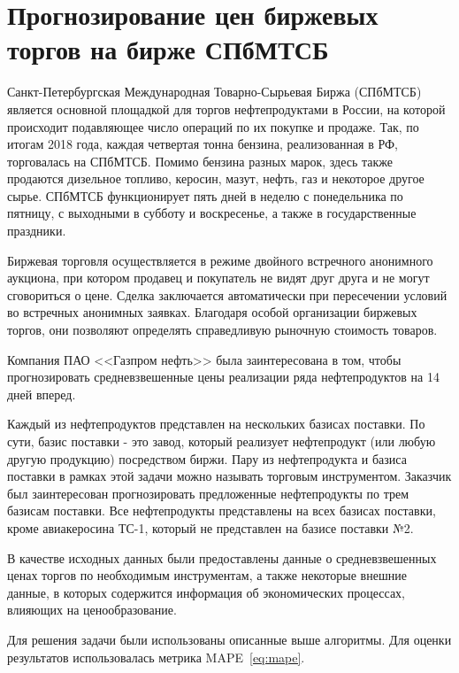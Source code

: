 \documentclass[a4paper,article,14pt]{extarticle}
\begin{document}


\pagebreak

\section{Прогнозирование цен биржевых торгов на бирже СПбМТСБ}

Санкт-Петербургская Международная Товарно-Сырьевая Биржа \linebreak
(СПбМТСБ)~\cite{spimex} является основной площадкой для торгов нефтепродуктами в России, на которой происходит подавляющее число операций по их покупке и продаже.
Так, по итогам 2018 года, каждая четвертая тонна бензина, реализованная в РФ, торговалась на СПбМТСБ.
Помимо бензина разных марок, здесь также продаются дизельное топливо, керосин, мазут, нефть, газ и некоторое другое сырье.
СПбМТСБ функционирует пять дней в неделю с понедельника по пятницу, с выходными в субботу и воскресенье, а также в государственные праздники.

Биржевая торговля осуществляется в режиме двойного встречного анонимного аукциона, при котором продавец и покупатель не видят друг друга и не могут сговориться о цене.
Сделка заключается автоматически при пересечении условий во встречных анонимных заявках.
Благодаря особой организации биржевых торгов, они позволяют определять справедливую рыночную стоимость товаров.

Компания ПАО <<Газпром нефть>> была заинтересована в том, чтобы прогнозировать средневзвешенные цены реализации ряда нефтепродуктов на 14 дней вперед.

Каждый из нефтепродуктов представлен на нескольких базисах поставки.
По сути, базис поставки - это завод, который реализует нефтепродукт (или любую другую продукцию) посредством биржи.
Пару из нефтепродукта и базиса поставки в рамках этой задачи можно называть торговым инструментом.
Заказчик был заинтересован прогнозировать предложенные нефтепродукты по трем базисам поставки.
Все нефтепродукты представлены на всех базисах поставки, кроме авиакеросина ТС-1, который не представлен на базисе поставки №2.

В качестве исходных данных были предоставлены данные о средневзвешенных ценах торгов по необходимым инструментам, а также некоторые внешние данные, в которых содержится информация об экономических процессах, влияющих на ценообразование.


Для решения задачи были использованы описанные выше алгоритмы.
Для оценки результатов использовалась метрика MAPE~\eqref{eq:mape}.
\end{document}
